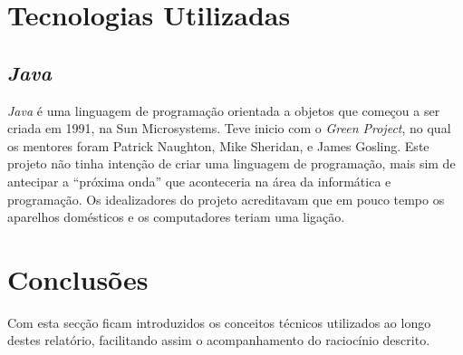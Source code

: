  \par

\section{Tecnologias Utilizadas}

\subsection{\textit{Java}}
\textit{Java} é uma linguagem de programação orientada a objetos que começou a ser criada em 1991, na Sun Microsystems. Teve inicio com o \textit{Green Project}, no qual os mentores foram Patrick Naughton, Mike Sheridan, e James Gosling. Este projeto não tinha intenção de criar uma linguagem de programação, mais sim de antecipar a “próxima onda” que aconteceria na área da informática e programação. Os idealizadores do projeto acreditavam que em pouco tempo os aparelhos domésticos e os computadores teriam uma ligação.

\section{Conclusões}
\label{chap2:sec:concs}

Com esta secção ficam introduzidos os conceitos técnicos utilizados ao longo destes relatório, facilitando assim o acompanhamento do raciocínio descrito.

